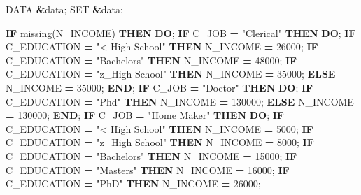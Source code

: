 \documentclass[]{article}
\newenvironment{Shaded}{\begin{snugshade}}{\end{snugshade}}
\newcommand{\KeywordTok}[1]{\textcolor[rgb]{0.13,0.29,0.53}{\textbf{{#1}}}}
\newcommand{\DataTypeTok}[1]{\textcolor[rgb]{0.13,0.29,0.53}{{#1}}}
\newcommand{\DecValTok}[1]{\textcolor[rgb]{0.00,0.00,0.81}{{#1}}}
\newcommand{\StringTok}[1]{\textcolor[rgb]{0.31,0.60,0.02}{{#1}}}
\newcommand{\NormalTok}[1]{{#1}}
\begin{document}
\begin{Shaded}
\begin{Highlighting}[]

\DataTypeTok{DATA} \KeywordTok{&}\NormalTok{data;}
    \NormalTok{SET }\KeywordTok{&}\NormalTok{data;}
    
    \KeywordTok{IF} \NormalTok{missing(N_INCOME) }\KeywordTok{THEN} \KeywordTok{DO}\NormalTok{;}
        \KeywordTok{IF} \NormalTok{C_JOB }\KeywordTok{=} \StringTok{"Clerical"} \KeywordTok{THEN} \KeywordTok{DO}\NormalTok{;}
            \KeywordTok{IF} \NormalTok{C_EDUCATION }\KeywordTok{=} \StringTok{"< High School"} \KeywordTok{THEN} \NormalTok{N_INCOME }\KeywordTok{=} \DecValTok{26000}\NormalTok{;}
            \KeywordTok{IF} \NormalTok{C_EDUCATION }\KeywordTok{=} \StringTok{"Bachelors"} \KeywordTok{THEN} \NormalTok{N_INCOME }\KeywordTok{=} \DecValTok{48000}\NormalTok{;}
            \KeywordTok{IF} \NormalTok{C_EDUCATION }\KeywordTok{=} \StringTok{"z_High School"} \KeywordTok{THEN} \NormalTok{N_INCOME }\KeywordTok{=} \DecValTok{35000}\NormalTok{;}
            \KeywordTok{ELSE} \NormalTok{N_INCOME }\KeywordTok{=} \DecValTok{35000}\NormalTok{;}
        \KeywordTok{END}\NormalTok{;}
        \KeywordTok{IF} \NormalTok{C_JOB }\KeywordTok{=} \StringTok{"Doctor"} \KeywordTok{THEN} \KeywordTok{DO}\NormalTok{;}
            \KeywordTok{IF} \NormalTok{C_EDUCATION }\KeywordTok{=} \StringTok{"Phd"} \KeywordTok{THEN} \NormalTok{N_INCOME }\KeywordTok{=} \DecValTok{130000}\NormalTok{;}
            \KeywordTok{ELSE} \NormalTok{N_INCOME }\KeywordTok{=} \DecValTok{130000}\NormalTok{;}
        \KeywordTok{END}\NormalTok{;}
        \KeywordTok{IF} \NormalTok{C_JOB }\KeywordTok{=} \StringTok{"Home Maker"} \KeywordTok{THEN} \KeywordTok{DO}\NormalTok{;}
            \KeywordTok{IF} \NormalTok{C_EDUCATION }\KeywordTok{=} \StringTok{"< High School"} \KeywordTok{THEN} \NormalTok{N_INCOME }\KeywordTok{=} \DecValTok{5000}\NormalTok{;}
            \KeywordTok{IF} \NormalTok{C_EDUCATION }\KeywordTok{=} \StringTok{"z_High School"} \KeywordTok{THEN} \NormalTok{N_INCOME }\KeywordTok{=} \DecValTok{8000}\NormalTok{;}
            \KeywordTok{IF} \NormalTok{C_EDUCATION }\KeywordTok{=} \StringTok{"Bachelors"} \KeywordTok{THEN} \NormalTok{N_INCOME }\KeywordTok{=} \DecValTok{15000}\NormalTok{;}
            \KeywordTok{IF} \NormalTok{C_EDUCATION }\KeywordTok{=} \StringTok{"Masters"} \KeywordTok{THEN} \NormalTok{N_INCOME }\KeywordTok{=} \DecValTok{16000}\NormalTok{;}
            \KeywordTok{IF} \NormalTok{C_EDUCATION }\KeywordTok{=} \StringTok{"PhD"} \KeywordTok{THEN} \NormalTok{N_INCOME }\KeywordTok{=} \DecValTok{26000}\NormalTok{;}

\end{Highlighting}
\end{Shaded}
\end{document}
